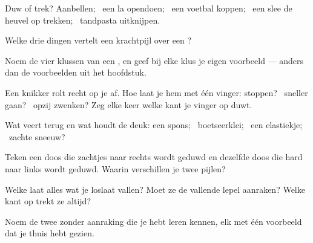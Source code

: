 \begin{exercise}[$\star$]\label{exo:g2:pushes-and-pulls:1}
Duw of trek? Aanbellen; \ een la opendoen; \ een voetbal koppen; \ een
slee de heuvel op trekken; \ tandpasta uitknijpen.
\end{exercise}

\begin{exercise}[$\star$]\label{exo:g2:pushes-and-pulls:2}
Welke drie dingen vertelt een krachtpijl over een ?
\end{exercise}

\begin{exercise}[$\star$]\label{exo:g2:pushes-and-pulls:3}
Noem de vier klussen van een , en geef bij elke klus je eigen
voorbeeld --- anders dan de voorbeelden uit het hoofdstuk.
\end{exercise}

\begin{exercise}[$\star$]\label{exo:g2:pushes-and-pulls:4}
Een knikker rolt recht op je af. Hoe laat je hem met één vinger:
stoppen? \ sneller gaan? \ opzij zwenken? Zeg elke keer welke kant je
vinger op duwt.
\end{exercise}

\begin{exercise}[$\star$]\label{exo:g2:pushes-and-pulls:5}
Wat veert terug en wat houdt de deuk: een spons; \ boetseerklei; \ een
elastiekje; \ zachte sneeuw?
\end{exercise}

\begin{exercise}[$\star$]\label{exo:g2:pushes-and-pulls:6}
Teken een doos die zachtjes naar rechts wordt geduwd en dezelfde doos
die hard naar links wordt geduwd. Waarin verschillen je twee pijlen?
\end{exercise}

\begin{exercise}[$\star$]\label{exo:g2:pushes-and-pulls:7}
Welke  laat alles wat je loslaat vallen? Moet ze de vallende
lepel aanraken? Welke kant op trekt ze altijd?
\end{exercise}

\begin{exercise}[$\star$]\label{exo:g2:pushes-and-pulls:8}
Noem de twee  zonder aanraking die je hebt leren kennen, elk met
één voorbeeld dat je thuis hebt gezien.
\end{exercise}

